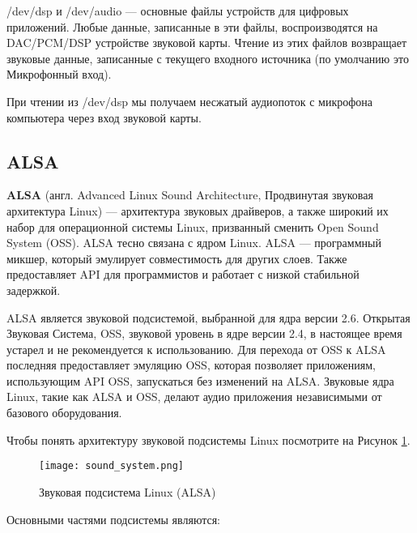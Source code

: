 /dev/dsp и /dev/audio — основные файлы устройств для цифровых приложений. Любые данные, записанные в эти файлы, воспроизводятся на DAC/PCM/DSP устройстве звуковой карты. Чтение из этих файлов возвращает звуковые данные, записанные с текущего входного источника (по умолчанию это Микрофонный вход).

При чтении из /dev/dsp мы получаем несжатый аудиопоток с микрофона компьютера через вход звуковой карты. 

\subsection{ALSA}

\textbf{ALSA} (англ. Advanced Linux Sound Architecture, Продвинутая звуковая архитектура Linux) — архитектура звуковых драйверов, а также широкий их набор для операционной системы Linux, призванный сменить Open Sound System (OSS). ALSA тесно связана с ядром Linux. ALSA — программный микшер, который эмулирует совместимость для других слоев. Также предоставляет API для программистов и работает с низкой стабильной задержкой. \cite{wiki-alsa}

ALSA является звуковой подсистемой, выбранной  для ядра версии 2.6. Открытая Звуковая Система, OSS, звуковой уровень в ядре версии 2.4, в настоящее время устарел и не рекомендуется к использованию. Для перехода от OSS к ALSA последняя предоставляет эмуляцию OSS, которая позволяет приложениям, использующим API OSS, запускаться без изменений на ALSA. Звуковые ядра Linux, такие как ALSA и OSS, делают аудио приложения независимыми от базового оборудования.

Чтобы понять архитектуру звуковой подсистемы Linux посмотрите на Рисунок  \ref{image:sound_system}. 

\begin{figure}[h]
  \centering
  \texttt{[image: sound\_system.png]}
  \caption{Звуковая подсистема Linux (ALSA)}
  \label{image:sound_system}
\end{figure}

Основными частями подсистемы являются:


